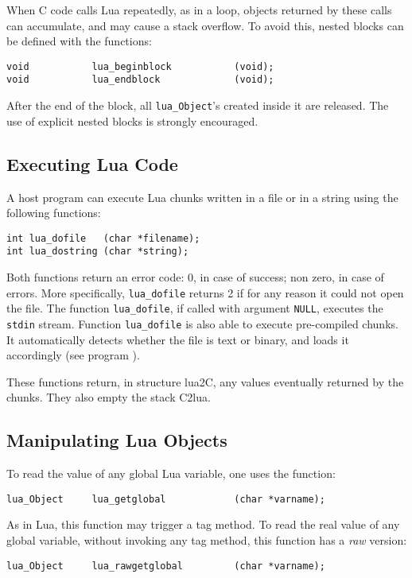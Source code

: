 When C code calls Lua repeatedly, as in a loop,
objects returned by these calls can accumulate,
and may cause a stack overflow.
To avoid this,
nested blocks can be defined with the functions:
\begin{verbatim}
void           lua_beginblock           (void);
void           lua_endblock             (void);
\end{verbatim}
After the end of the block,
all \verb|lua_Object|'s created inside it are released.
The use of explicit nested blocks is strongly encouraged.

\subsection{Executing Lua Code}
A host program can execute Lua chunks written in a file or in a string
using the following functions:
\begin{verbatim}
int lua_dofile   (char *filename);
int lua_dostring (char *string);
\end{verbatim}
Both functions return an error code:
0, in case of success; non zero, in case of errors.
More specifically, \verb|lua_dofile| returns 2 if for any reason
it could not open the file.
The function \verb|lua_dofile|, if called with argument \verb|NULL|,
executes the \verb|stdin| stream.
Function \verb|lua_dofile| is also able to execute pre-compiled chunks.
It automatically detects whether the file is text or binary,
and loads it accordingly (see program ).

These functions return, in structure lua2C,
any values eventually returned by the chunks.
They also empty the stack C2lua.


\subsection{Manipulating Lua Objects}
To read the value of any global Lua variable,
one uses the function:
\begin{verbatim}
lua_Object     lua_getglobal            (char *varname);
\end{verbatim}
As in Lua, this function may trigger a tag method.
To read the real value of any global variable,
without invoking any tag method,
this function has a \emph{raw} version:
\begin{verbatim}
lua_Object     lua_rawgetglobal         (char *varname);
\end{verbatim}


